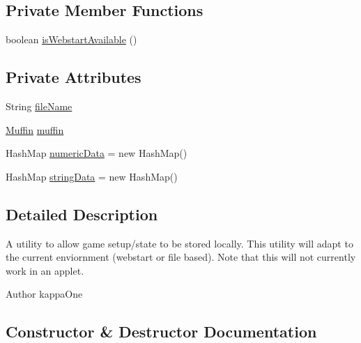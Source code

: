 \subsection*{Private Member Functions}
\begin{DoxyCompactItemize}
\item 
boolean \mbox{\hyperlink{classorg_1_1newdawn_1_1slick_1_1_saved_state_a2073d608e7e841ae5ff8eef63f596cf2}{is\+Webstart\+Available}} ()
\end{DoxyCompactItemize}
\subsection*{Private Attributes}
\begin{DoxyCompactItemize}
\item 
String \mbox{\hyperlink{classorg_1_1newdawn_1_1slick_1_1_saved_state_ace5c7436bfdba5164f2b1826bb173388}{file\+Name}}
\item 
\mbox{\hyperlink{interfaceorg_1_1newdawn_1_1slick_1_1muffin_1_1_muffin}{Muffin}} \mbox{\hyperlink{classorg_1_1newdawn_1_1slick_1_1_saved_state_a461d13c1acfff7fbc631724ff5fae6a1}{muffin}}
\item 
Hash\+Map \mbox{\hyperlink{classorg_1_1newdawn_1_1slick_1_1_saved_state_ad734be75c78cdbd06ed020c7d416e187}{numeric\+Data}} = new Hash\+Map()
\item 
Hash\+Map \mbox{\hyperlink{classorg_1_1newdawn_1_1slick_1_1_saved_state_a5c7e1053721ddfee0b4a2a29facd103b}{string\+Data}} = new Hash\+Map()
\end{DoxyCompactItemize}


\subsection{Detailed Description}
A utility to allow game setup/state to be stored locally. This utility will adapt to the current enviornment (webstart or file based). Note that this will not currently work in an applet.

\begin{DoxyAuthor}{Author}
kappa\+One 
\end{DoxyAuthor}


\subsection{Constructor \& Destructor Documentation}
\mbox{\label{classorg_1_1newdawn_1_1slick_1_1_saved_state_aef2409061a497111c6a6b64a798af41d}} 
